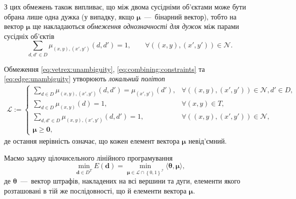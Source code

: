 З цих обмежень також випливає,
що між двома сусідніми об'єктами може бути обрана лише одна дужка
(у випадку, якщо $\pmb{\mu}$~---~бінарний вектор),
тобто на вектор $\pmb{\mu}$
ще накладаються \textit{обмеження однозначності для дужок}
між парами сусідніх об'єктів
\begin{equation} \label{eq:edge:unambiguity}
    \sum \limits_{d, d' \in D}
        \mu_{\left(x, y \right), \left(x', y' \right)} \left(d, d' \right) = 1,
        \qquad \forall
        \left(\left(x, y \right), \left(x', y' \right) \right) \in \mathcal{N}.
\end{equation}

Обмеження \eqref{eq:vetrex:unambiguity}, \eqref{eq:combining:constraints} та
\eqref{eq:edge:unambiguity} утворюють \textit{локальний політоп}
\begin{equation} \label{eq:local:polytop}
\begin{gathered}
    \mathcal{L} :=
    \begin{cases}
        \sum \limits_{d \in D}
            \mu_{\left(x, y \right), \left(x', y' \right)} \left(d, d' \right) =
            \mu_{\left(x', y' \right)} \left(d' \right), &
        \forall
        \left( \left(x, y \right), \left(x',y' \right) \right) \in \mathcal{N},
        d' \in D, \\
        \sum \limits_{d \in D} \mu_{\left( x, y \right)} \left( d \right) = 1,
        & \forall \left(x, y \right) \in T, \\
        \sum \limits_{d, d' \in D}
            \mu_{\left(x, y \right), \left(x', y' \right)} \left(
                d, d'
            \right) = 1, & \forall
            \left(\left(x, y \right), \left(x', y' \right) \right) \in
                \mathcal{N}, \\
        \pmb{\mu} \ge \pmb{0},
    \end{cases}
\end{gathered}
\end{equation}
де остання нерівність означає, що кожен елемент вектора $\pmb{\mu}$ невід'ємний.

Маємо задачу цілочисельного лінійного програмування
\begin{equation*}
    \min \limits_{\pmb{d} \in D^T} E \left( \pmb{d} \right) =
    \min \limits_{\pmb{\mu} \in \mathcal{L} \cap \left\{ 0, 1 \right\}^{\mathcal{I}}}
        \langle \pmb{\theta}, \pmb{\mu} \rangle,
\end{equation*}
де $\pmb{\theta}$~---~вектор штрафів, накладених на всі вершини та дуги,
елементи якого розташовані в тій же послідовності,
що й елементи вектора $\pmb{\mu}$.

